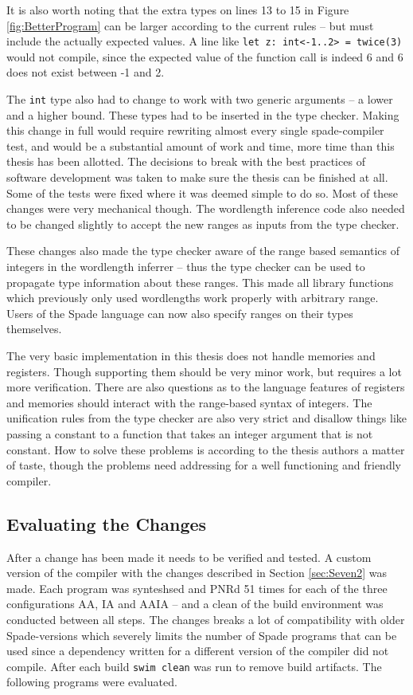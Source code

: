 It is also worth noting that the extra types on lines 13 to 15 in Figure \ref{fig:BetterProgram} can be larger according to the current rules -- but must include the actually expected values. A line like \verb+let z: int<-1..2> = twice(3)+ would not compile, since the expected value of the function call is indeed 6 and 6 does not exist between -1 and 2.

The \verb+int+ type also had to change to work with two generic arguments -- a lower and a higher bound. These types had to be inserted in the type checker. Making this change in full would require rewriting almost every single spade-compiler test, and would be a substantial amount of work and time, more time than this thesis has been allotted. The decisions to break with the best practices of software development was taken to make sure the thesis can be finished at all. Some of the tests were fixed where it was deemed simple to do so. Most of these changes were very mechanical though. The wordlength inference code also needed to be changed slightly to accept the new ranges as inputs from the type checker.

These changes also made the type checker aware of the range based semantics of integers in the wordlength inferrer -- thus the type checker can be used to propagate type information about these ranges. This made all library functions which previously only used wordlengths work properly with arbitrary range. Users of the Spade language can now also specify ranges on their types themselves.

The very basic implementation in this thesis does not handle memories and registers. Though supporting them should be very minor work, but requires a lot more verification. There are also questions as to the language features of registers and memories should interact with the range-based syntax of integers. The unification rules from the type checker are also very strict and disallow things like passing a constant to a function that takes an integer argument that is not constant. How to solve these problems is according to the thesis authors a matter of taste, though the problems need addressing for a well functioning and friendly compiler.

\subsection{Evaluating the Changes}
After a change has been made it needs to be verified and tested. A custom version of the compiler with the changes described in Section \ref{sec:Seven2} was made. Each program was synteshsed and PNRd 51 times for each of the three configurations AA, IA and AAIA -- and a clean of the build environment was conducted between all steps. The changes breaks a lot of compatibility with older Spade-versions which severely limits the number of Spade programs that can be used since a dependency written for a different version of the compiler did not compile. After each build \verb+swim clean+ was run to remove build artifacts. The following programs were evaluated. 

